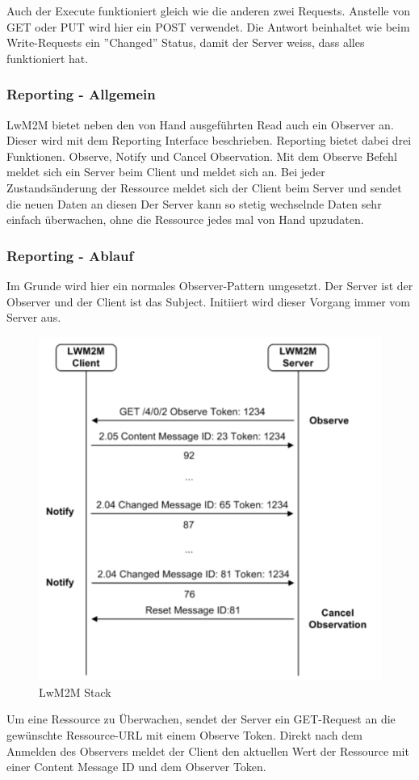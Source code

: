 Auch der Execute funktioniert gleich wie die anderen zwei Requests. Anstelle von GET oder PUT wird hier ein POST verwendet. Die Antwort beinhaltet wie beim Write-Requests ein ''Changed'' Status, damit der Server weiss, dass alles funktioniert hat.

\newpage

\subsubsection{Reporting - Allgemein}
LwM2M bietet neben den von Hand ausgeführten Read auch ein Observer an. Dieser wird mit dem Reporting Interface beschrieben. Reporting bietet dabei drei Funktionen. Observe, Notify und Cancel Observation. Mit dem Observe Befehl meldet sich ein Server beim Client und meldet sich an. Bei jeder Zustandsänderung der Ressource meldet sich der Client beim Server und sendet die neuen Daten an diesen Der Server kann so stetig wechselnde Daten sehr einfach überwachen, ohne die Ressource jedes mal von Hand upzudaten.
\subsubsection{Reporting - Ablauf}
Im Grunde wird hier ein normales Observer-Pattern umgesetzt. Der Server ist der Observer und der Client ist das Subject. Initiiert wird dieser Vorgang immer vom Server aus. 
\begin{figure}[H]
\includegraphics[scale=0.4]{../02_Analyse/images/lwm2m/report_diagram.png}
\caption{LwM2M Stack\cite{LwM2MInterfaces}}
\end{figure}
Um eine Ressource zu Überwachen, sendet der Server ein GET-Request an die gewünschte Ressource-URL mit einem Observe Token. Direkt nach dem Anmelden des Observers meldet der Client den aktuellen Wert der Ressource mit einer Content Message ID und dem Observer Token.

